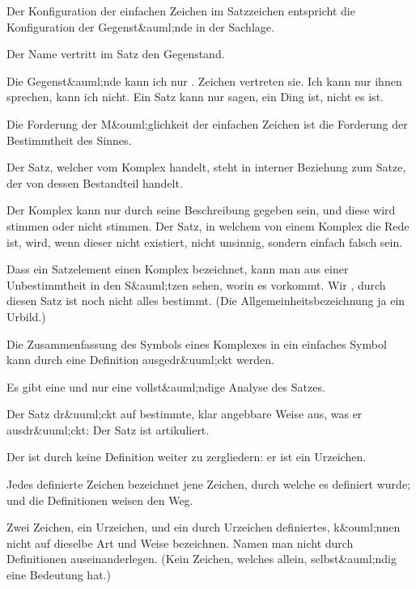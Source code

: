 {Der Konfiguration der einfachen Zeichen im
Satzzeichen entspricht die Konfiguration der Gegenst&auml;nde
in der Sachlage.}


{Der Name vertritt im Satz den Gegenstand.}


{Die Gegenst&auml;nde kann ich nur . Zeichen
vertreten sie. Ich kann nur  ihnen sprechen,
 kann ich nicht. Ein Satz
kann nur sagen,  ein Ding ist, nicht  es ist.}


{Die Forderung der M&ouml;glichkeit der einfachen
Zeichen ist die Forderung der Bestimmtheit des
Sinnes.}


{Der Satz, welcher vom Komplex handelt, steht
in interner Beziehung zum Satze, der von dessen
Bestandteil handelt.

Der Komplex kann nur durch seine Beschreibung
gegeben sein, und diese wird stimmen oder
nicht stimmen. Der Satz, in welchem von einem
Komplex die Rede ist, wird, wenn dieser nicht
existiert, nicht unsinnig, sondern einfach falsch sein.

Dass ein Satzelement einen Komplex bezeichnet,
kann man aus einer Unbestimmtheit in den S&auml;tzen
sehen, worin es vorkommt. Wir , durch
diesen Satz ist noch nicht alles bestimmt. (Die
Allgemeinheitsbezeichnung  ja ein Urbild.)

Die Zusammenfassung des Symbols eines Komplexes
in ein einfaches Symbol kann durch eine
\enlargethispage{4pt} %
Definition ausgedr&uuml;ckt werden.}


{Es gibt eine und nur eine vollst&auml;ndige Analyse
des Satzes.}


{Der Satz dr&uuml;ckt auf bestimmte, klar angebbare
Weise aus, was er ausdr&uuml;ckt: Der Satz ist artikuliert.}


{Der  ist durch keine Definition weiter zu
zergliedern: er ist ein Urzeichen.}


{Jedes definierte Zeichen bezeichnet  jene
Zeichen, durch welche es definiert wurde; und die
Definitionen weisen den Weg.

Zwei Zeichen, ein Urzeichen, und ein durch
Urzeichen definiertes, k&ouml;nnen nicht auf dieselbe
Art und Weise bezeichnen. Namen  man
nicht durch Definitionen auseinanderlegen. (Kein
Zeichen, welches allein, selbst&auml;ndig eine Bedeutung
hat.)}


